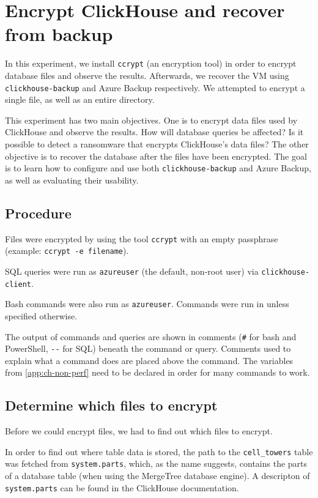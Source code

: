 \section{Encrypt ClickHouse and recover from backup} \label{app:chs1e1}
In this experiment, we install \texttt{ccrypt} (an encryption tool)
in order to encrypt database files and observe the results.
Afterwards, we recover the VM using \texttt{clickhouse-backup} and Azure Backup respectively.
We attempted to encrypt a single file, as well as an entire directory.

This experiment has two main objectives.
One is to encrypt data files used by ClickHouse and observe the results.
How will database queries be affected?
Is it possible to detect a ransomware that encrypts ClickHouse's data files?
The other objective is to recover the database after the files have been encrypted.
The goal is to learn how to configure and use both \texttt{clickhouse-backup} and Azure Backup,
as well as evaluating their usability.

\subsection{Procedure}
\label{sec:org8373240}
Files were encrypted by using the tool \texttt{ccrypt}
with an empty passphrase (example: \texttt{ccrypt -e filename}).

SQL queries were run as \texttt{azureuser} (the default, non-root user) via \texttt{clickhouse-client}.

Bash commands were also run as \texttt{azureuser}.
Commands were run in  unless specified otherwise.

The output of commands and queries are shown in comments (\texttt{\#} for bash and PowerShell, \texttt{-{}-} for SQL) beneath the command or query.
Comments used to explain what a command does are placed above the command.
The variables from \ref{app:ch-non-perf} need to be declared in order for many commands to work.

\subsection{Determine which files to encrypt}
\label{sec:orge561d86}
Before we could encrypt files, we had to find out which files to encrypt.

In order to find out where table data is stored,
the path to the \texttt{cell\_towers} table was fetched from \texttt{system.parts},
which, as the name suggests, contains the parts of a database table
(when using the MergeTree database engine).
A descripton of \texttt{system.parts} can be found in the ClickHouse documentation.
\cite{noauthor_parts_nodate}

